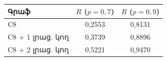 \begin{tabular}{|l|c|c|}
\hline
Գրաֆ & $R$ ($p=0{,}7$) & $R$ ($p=0{,}9$)\\
\hline
C8 & 0{,}2553 & 0{,}8131\\
\hline
C8 + 1 լրաց. կող & 0{,}3739 & 0{,}8896\\
\hline
C8 + 2 լրաց. կող & 0{,}5221 & 0{,}9470\\
\hline
\end{tabular}
